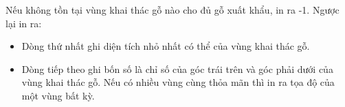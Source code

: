 Nếu không tồn tại vùng khai thác gỗ nào cho đủ gỗ xuất khẩu, in ra -1. Ngược lại in ra:
\begin{itemize}
	\item Dòng thứ nhất ghi diện tích nhỏ nhất có thể của vùng khai thác gỗ.
	\item Dòng tiếp theo ghi bốn số là chỉ số của góc trái trên và góc phải dưới của vùng khai thác gỗ. Nếu có nhiều vùng cùng thỏa mãn thì in ra tọa độ của một vùng bất kỳ.
\end{itemize}

\